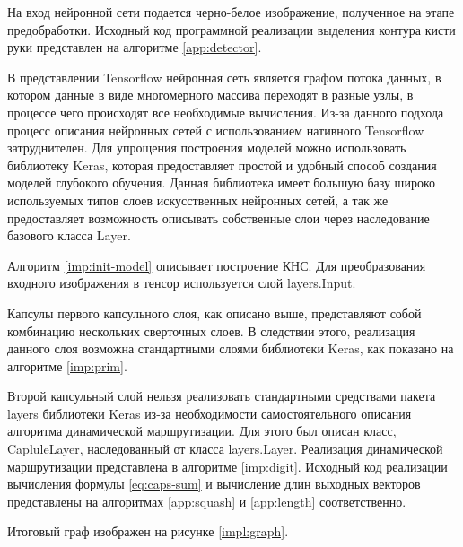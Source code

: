 На вход нейронной сети подается черно-белое изображение, полученное на этапе предобработки. Исходный код программной реализации выделения контура кисти руки представлен на алгоритме \ref{app:detector}.

В представлении Tensorflow нейронная сеть является графом потока данных, в котором данные в виде многомерного массива переходят в разные узлы, в процессе чего происходят все необходимые вычисления. Из-за данного подхода процесс описания нейронных сетей с использованием нативного Tensorflow затруднителен. Для упрощения построения моделей можно использовать библиотеку Keras, которая предоставляет простой и удобный способ создания моделей глубокого обучения. Данная библиотека имеет большую базу широко используемых типов слоев искусственных нейронных сетей, а так же предоставляет возможность описывать собственные слои через наследование базового класса Layer.

Алгоритм \ref{imp:init-model} описывает построение КНС. Для преобразования входного изображения в тенсор используется слой layers.Input.

Капсулы первого капсульного слоя, как описано выше, представляют собой комбинацию нескольких сверточных слоев. В следствии этого, реализация данного слоя возможна стандартными слоями библиотеки Keras, как показано на алгоритме \ref{imp:prim}.

Второй капсульный слой нельзя реализовать стандартными средствами пакета layers библиотеки Keras из-за необходимости самостоятельного описания алгоритма динамической маршрутизации. Для этого был описан класс, CapluleLayer, наследованный от класса layers.Layer. Реализация динамической маршрутизации представлена в алгоритме \ref{imp:digit}. Исходный код реализации вычисления формулы \ref{eq:caps-sum} и вычисление длин выходных векторов представлены на алгоритмах \ref{app:squash} и \ref{app:length} соответственно.

Итоговый граф изображен на рисунке \ref{impl:graph}.

